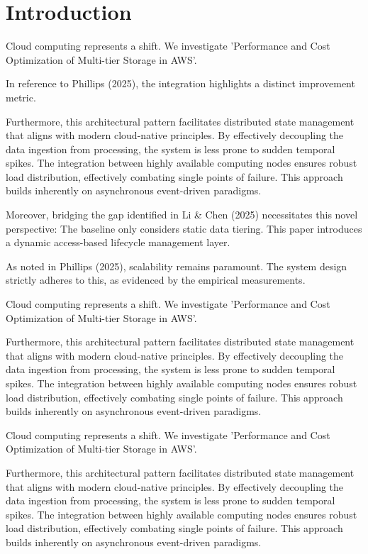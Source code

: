 \chapter{Introduction}
Cloud computing represents a shift. We investigate 'Performance and Cost Optimization of Multi-tier Storage in AWS'.

In reference to Phillips (2025), the integration highlights a distinct improvement metric.


Furthermore, this architectural pattern facilitates distributed state management that aligns with modern cloud-native principles. 
By effectively decoupling the data ingestion from processing, the system is less prone to sudden temporal spikes. 
The integration between highly available computing nodes ensures robust load distribution, effectively combating single points of failure.
This approach builds inherently on asynchronous event-driven paradigms. 


Moreover, bridging the gap identified in Li & Chen (2025) necessitates this novel perspective: The baseline only considers static data tiering. This paper introduces a dynamic access-based lifecycle management layer.

As noted in Phillips (2025), scalability remains paramount. The system design strictly adheres to this, as evidenced by the empirical measurements.

Cloud computing represents a shift. We investigate 'Performance and Cost Optimization of Multi-tier Storage in AWS'.


Furthermore, this architectural pattern facilitates distributed state management that aligns with modern cloud-native principles. 
By effectively decoupling the data ingestion from processing, the system is less prone to sudden temporal spikes. 
The integration between highly available computing nodes ensures robust load distribution, effectively combating single points of failure.
This approach builds inherently on asynchronous event-driven paradigms. 


Cloud computing represents a shift. We investigate 'Performance and Cost Optimization of Multi-tier Storage in AWS'.


Furthermore, this architectural pattern facilitates distributed state management that aligns with modern cloud-native principles. 
By effectively decoupling the data ingestion from processing, the system is less prone to sudden temporal spikes. 
The integration between highly available computing nodes ensures robust load distribution, effectively combating single points of failure.
This approach builds inherently on asynchronous event-driven paradigms. 



